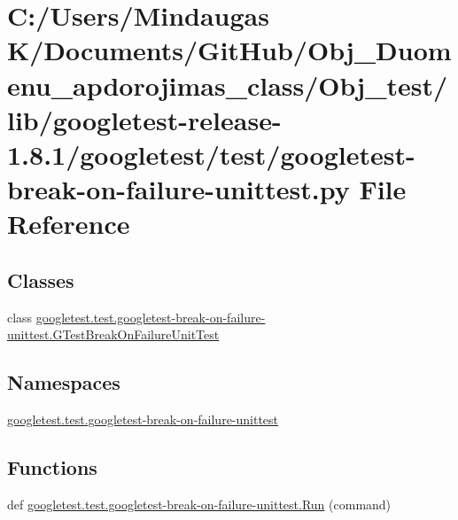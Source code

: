 \hypertarget{_obj__test_2lib_2googletest-release-1_88_81_2googletest_2test_2googletest-break-on-failure-unittest_8py}{}\section{C\+:/\+Users/\+Mindaugas K/\+Documents/\+Git\+Hub/\+Obj\+\_\+\+Duomenu\+\_\+apdorojimas\+\_\+class/\+Obj\+\_\+test/lib/googletest-\/release-\/1.8.1/googletest/test/googletest-\/break-\/on-\/failure-\/unittest.py File Reference}
\label{_obj__test_2lib_2googletest-release-1_88_81_2googletest_2test_2googletest-break-on-failure-unittest_8py}
\subsection*{Classes}
\begin{DoxyCompactItemize}
\item 
class \mbox{\hyperlink{classgoogletest_1_1test_1_1googletest-break-on-failure-unittest_1_1_g_test_break_on_failure_unit_test}{googletest.\+test.\+googletest-\/break-\/on-\/failure-\/unittest.\+G\+Test\+Break\+On\+Failure\+Unit\+Test}}
\end{DoxyCompactItemize}
\subsection*{Namespaces}
\begin{DoxyCompactItemize}
\item 
 \mbox{\hyperlink{namespacegoogletest_1_1test_1_1googletest-break-on-failure-unittest}{googletest.\+test.\+googletest-\/break-\/on-\/failure-\/unittest}}
\end{DoxyCompactItemize}
\subsection*{Functions}
\begin{DoxyCompactItemize}
\item 
def \mbox{\hyperlink{namespacegoogletest_1_1test_1_1googletest-break-on-failure-unittest_a41207960c4384673ca09f521873c8161}{googletest.\+test.\+googletest-\/break-\/on-\/failure-\/unittest.\+Run}} (command)
\end{DoxyCompactItemize}
